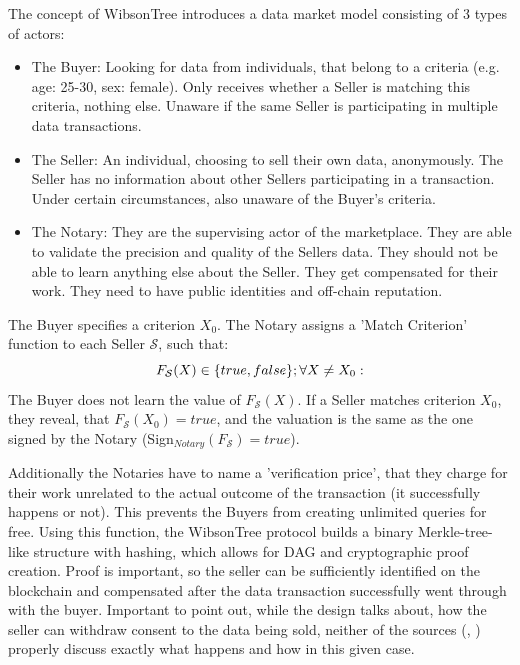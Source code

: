 \documentclass[english, 12pt, a4paper, sci, utf8, a-2b, online]{aaltothesis}
\theoremstyle{change}
\theoremstyle{theoremstyle}
\begin{document}
The concept of WibsonTree \cite{futoransky2020wibsontree} introduces a data market model consisting of 3 types of actors:
\begin{itemize}
    \item The Buyer: Looking for data from individuals, that belong to a criteria (e.g. age: 25-30, sex: female). Only receives whether a Seller is matching this criteria, nothing else. Unaware if the same Seller is participating in multiple data transactions.
    \item The Seller: An individual, choosing to sell their own data, anonymously. The Seller has no information about other Sellers participating in a transaction. Under certain circumstances, also unaware of the Buyer's criteria.
    \item The Notary: They are the supervising actor of the marketplace. They are able to validate the precision and quality of the Sellers data. They should not be able to learn anything else about the Seller. They get compensated for their work. They need to have public identities and off-chain reputation. \cite{travizano2020wibson}
\end{itemize}
The Buyer specifies a criterion $X_0$. The Notary assigns a 'Match Criterion' function to each Seller $\mathcal{S}$, such that:
\begin{equation*}
    F_{\mathcal{S}}(X) \in \{true, false\};\\
    \forall X \neq X_0:
\end{equation*}
The Buyer does not learn the value of $F_{\mathcal{S}}(X)$. If a Seller matches criterion $X_0$, they reveal, that $F_{\mathcal{S}}(X_0) = true$, and the valuation is the same as the one signed by the Notary (Sign$_{Notary} (F_\mathcal{S}) = true$).

Additionally the Notaries have to name a 'verification price', that they charge for their work unrelated to the actual outcome of the transaction (it successfully happens or not). This prevents the Buyers from creating unlimited queries for free.
Using this function, the WibsonTree protocol builds a binary Merkle-tree-like structure with hashing, which allows for DAG and cryptographic proof creation. Proof is important, so the seller can be sufficiently identified on the blockchain and compensated after the data transaction successfully went through with the buyer.
Important to point out, while the design talks about, how the seller can withdraw consent to the data being sold, neither of the sources (\cite{futoransky2020wibsontree}, \cite{travizano2020wibson}) properly discuss exactly what happens and how in this given case.
\end{document}
